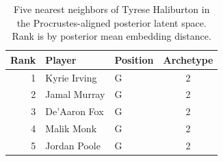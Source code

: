\begin{table}[htbp]
  \centering\small
  \begin{tabular}{rllc}
    \toprule
    Rank & Player & Position & Archetype \\
    \midrule
    1 & Kyrie Irving & G & 2 \\
    2 & Jamal Murray & G & 2 \\
    3 & De'Aaron Fox & G & 2 \\
    4 & Malik Monk & G & 2 \\
    5 & Jordan Poole & G & 2 \\
    \bottomrule
  \end{tabular}
  \caption{Five nearest neighbors of Tyrese Haliburton in the Procrustes-aligned posterior latent space. Rank is by posterior mean embedding distance.}
  \label{tab:Tyrese_Haliburton_neighbors}
\end{table}

